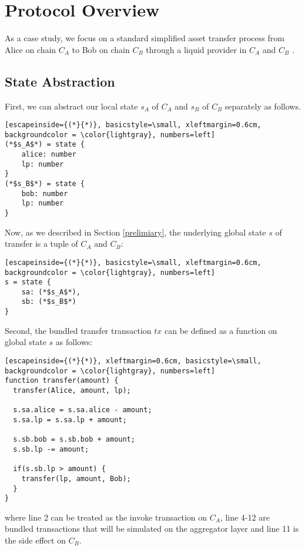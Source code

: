 \section{Protocol Overview}
\label{chp:case-study}
As a case study, we focus on a standard simplified asset transfer process from Alice on chain $C_A$ to Bob on chain $C_B$ through a liquid provider in $C_A$ and $C_B$ \cite{introdefi}. 



\subsection{State Abstraction}
First, 
we can abstract our local state $s_A$ of $C_A$ and $s_B$ of $C_B$ separately as follows.

\begin{lstlisting}[escapeinside={(*}{*)}, basicstyle=\small, xleftmargin=0.6cm, backgroundcolor = \color{lightgray}, numbers=left]
(*$s_A$*) = state {
    alice: number
    lp: number
}
(*$s_B$*) = state {
    bob: number
    lp: number
}
\end{lstlisting}

Now, as we described in Section \ref{prelimiary}, the underlying global state $s$ of transfer is a tuple of $C_A$ and $C_B$:
\begin{lstlisting}[escapeinside={(*}{*)}, basicstyle=\small, xleftmargin=0.6cm, backgroundcolor = \color{lightgray}, numbers=left]
s = state {
    sa: (*$s_A$*),
    sb: (*$s_B$*)
}
\end{lstlisting}
Second, the bundled transfer transaction $tx$ can be defined as a function on global state $s$ as follows:
\begin{lstlisting}[escapeinside={(*}{*)}, xleftmargin=0.6cm, basicstyle=\small, backgroundcolor = \color{lightgray}, numbers=left]
function transfer(amount) {
  transfer(Alice, amount, lp);
  
  s.sa.alice = s.sa.alice - amount;
  s.sa.lp = s.sa.lp + amount;
  
  s.sb.bob = s.sb.bob + amount;
  s.sb.lp -= amount;
  
  if(s.sb.lp > amount) {
    transfer(lp, amount, Bob);
  }
}
\end{lstlisting}
where line 2 can be treated as the invoke transaction on $C_A$, line 4-12 are bundled transactions that will be simulated on the aggregator layer and line 11 is the side effect on $C_B$.

